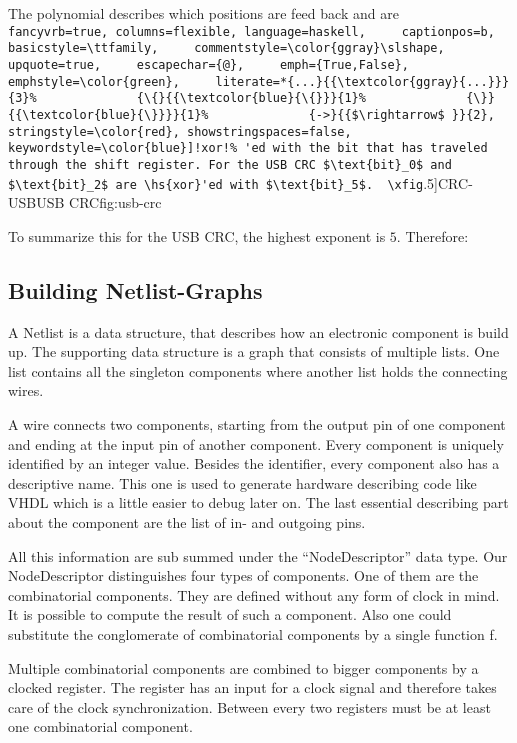 \documentclass[a4paper,UKenglish]{lipics}
\makeatletter
\newcommand{\hs}[1]{%
  \lstinline[
    fancyvrb=true, columns=flexible, language=haskell,
    captionpos=b,
    basicstyle=\ttfamily,
    commentstyle=\color{ggray}\slshape,
    upquote=true,
    escapechar={@},
    emph={True,False}, emphstyle=\color{green},
    literate=*{...}{{\textcolor{ggray}{...}}}{3}%
             {\{}{{\textcolor{blue}{\{}}}{1}%
             {\}}{{\textcolor{blue}{\}}}}{1}%
             {->}{{$\rightarrow$ }}{2},
    stringstyle=\color{red}, showstringspaces=false,
    keywordstyle=\color{blue}]!#1!%
}
\newcommand{\xfig}[4][0.9] {%
    \begin{figure}[ht]
        \begin{center}
            \graphicspath{{./}{Images/}}
            \scalebox{#1}{%
                
            }
            \caption{\label{#4} #3}
        \end{center}
    \end{figure}
}
\makeatother
\begin{document}
The polynomial describes which positions are feed back and are \hs{xor}'ed with the bit that has traveled through the shift
register. For the USB CRC $\text{bit}_0$ and $\text{bit}_2$ are \hs{xor}'ed with $\text{bit}_5$.

\xfig[.5]{CRC-USB}{USB CRC}{fig:usb-crc}

To summarize this for the USB CRC, the highest exponent is $5$. Therefore:



\subsection{Building Netlist-Graphs}
A Netlist is a data structure, that describes how an electronic component is build up. The supporting data structure is a graph
that consists of multiple lists. One list contains all the singleton components where another list holds the connecting wires. 

A wire connects two components, starting from the output pin of one component and ending at the input pin of another
component. Every component is uniquely identified by an integer value. Besides the identifier, every component also has a
descriptive name. This one is used to generate hardware describing code like VHDL which is a little easier to debug later on. The
last essential describing part about the component are the list of in- and outgoing pins. 

All this information are sub summed under the ``NodeDescriptor'' data type. Our NodeDescriptor distinguishes four types of
components. One of them are the combinatorial components. They are defined without any form of clock in mind. It is possible to
compute the result of such a component. Also one could substitute the conglomerate of combinatorial components by a single
function f. 

Multiple combinatorial components are combined to bigger components by a clocked register. The register has an input for a clock
signal and therefore takes care of the clock synchronization. Between every two registers must be at least one combinatorial
component.
\end{document}
